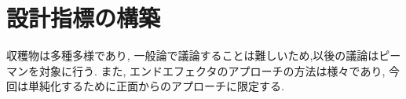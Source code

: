 \chapter{設計指標の構築}
\label{chap:designindex}
収穫物は多種多様であり, 一般論で議論することは難しいため,以後の議論はピーマンを対象に行う.
また, エンドエフェクタのアプローチの方法は様々であり, 今回は単純化するために正面からのアプローチに限定する.
%

%

%

%

%